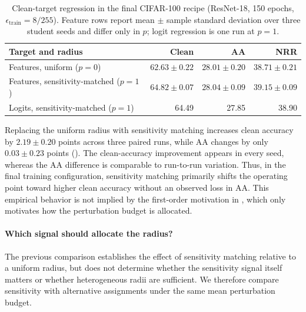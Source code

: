 \begin{table}[!htbp]
  \centering
  \small
  \setlength{\tabcolsep}{5pt}
  \caption{
  Clean-target regression in the final CIFAR-100 recipe
  (ResNet-18, 150 epochs, \(\epsilon_{\mathrm{train}}=8/255\)).
  Feature rows report mean \(\pm\) sample standard deviation over three
  student seeds and differ only in \(p\); logit regression is one run at
  \(p=1\).
  }
  \label{tab:finalallocation}
  \begin{tabular}{lrrr}
    \toprule
    Target and radius & Clean & AA & NRR \\
    \midrule
    Features, uniform (\(p=0\))
      & \(62.63\pm0.22\)
      & \(28.01\pm0.20\)
      & \(38.71\pm0.21\) \\
    Features, sensitivity-matched (\(p=1\))
      & \(\mathbf{64.82\pm0.07}\)
      & \(\mathbf{28.04\pm0.09}\)
      & \(\mathbf{39.15\pm0.09}\) \\
    Logits, sensitivity-matched (\(p=1\))
      & 64.49 & 27.85 & 38.90 \\
    \bottomrule
  \end{tabular}
\end{table}

Replacing the uniform radius with sensitivity matching increases clean
accuracy by \(2.19\pm0.20\) points across three paired runs, while AA changes
by only \(0.03\pm0.23\) points ().
The clean-accuracy improvement appears in every seed, whereas the AA
difference is comparable to run-to-run variation.
Thus, in the final training configuration, sensitivity matching primarily
shifts the operating point toward higher clean accuracy without an observed
loss in AA.
This empirical behavior is not implied by the first-order motivation in
, which only motivates how the perturbation budget is
allocated.


\paragraph{Which signal should allocate the radius?}

The previous comparison establishes the effect of sensitivity matching
relative to a uniform radius, but does not determine whether the sensitivity
signal itself matters or whether heterogeneous radii are sufficient.
We therefore compare sensitivity with alternative assignments under the same
mean perturbation budget.

